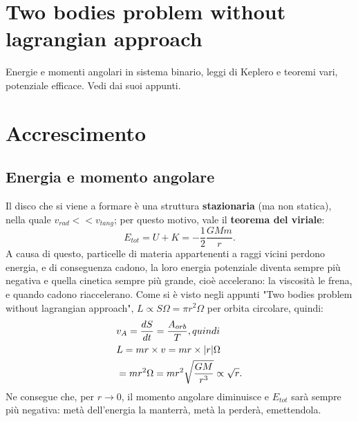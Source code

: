 % 
% 
% 
% 

\section{Two bodies problem without lagrangian approach}
Energie e momenti angolari in sistema binario, leggi di Keplero e teoremi vari, potenziale efficace. Vedi dai suoi appunti.

\section{Accrescimento}

\subsection{Energia e momento angolare}
Il disco che si viene a formare è una struttura \textbf{stazionaria} (ma non statica), nella quale $v_{rad}<<v_{tang} $; per questo motivo, vale il \textbf{teorema del viriale}:
\begin{equation}
    E_{tot} = U + K = -\frac{1}{2}\frac{GMm}{r}.
\end{equation}
A causa di questo, particelle di materia appartenenti a raggi vicini perdono energia, e di conseguenza cadono, la loro energia potenziale diventa sempre più negativa e quella cinetica sempre più grande, cioè accelerano: la viscosità le frena, e quando cadono riaccelerano.
Come si è visto negli appunti "Two bodies problem without lagrangian approach", $L\propto S \Omega = \pi r^2 \Omega$ per orbita circolare, quindi:
\begin{align}
    &v_A = \frac{dS}{dt} = \frac{A_{orb}}{T}, quindi\notag\\ 
    &L = mr\times v = mr\times |r|\Omega\notag\\
    &= mr^2\Omega =mr^2\sqrt{\frac{GM}{r^3}} \propto \sqrt{r}.
\end{align}
Ne consegue che, per $r\xrightarrow{} 0$, il momento angolare diminuisce e $E_{tot}$ sarà sempre più negativa: metà dell'energia la manterrà, metà la perderà, emettendola.

